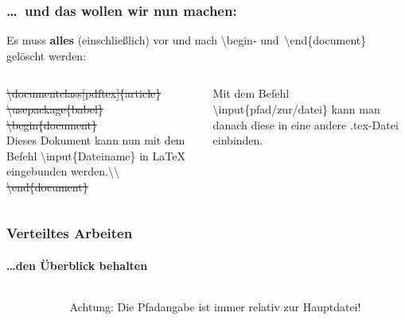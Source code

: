 
\begin{frame}
\frametitle{\ldots ~und das wollen wir nun machen:}
Es muss \textbf{alles} (einschlie\ss lich) vor und nach \color{unibablueI}\textbackslash begin\color{black}- 
und\color{unibablueI}~\textbackslash end\color{black}\{document\} gel\"oscht werden:\\[5mm]
\begin{columns}
\begin{column}{.47\textwidth}
\sout{\color{nounibaredI}\color{nounibaredI}\textbackslash documentclass\color{black}\color{nounibagreenI}[pdftex]\color{black}\{article\} \\
\color{nounibaredI}\textbackslash usepackage\color{black}\{babel\}\\
\color{nounibaredI}\color{unibablueI}\textbackslash\color{unibablueI}begin\color{black}\color{black}\{document\} }\\
Dieses Dokument kann nun mit dem Befehl \color{nounibaredI}\color{nounibaredI}\textbackslash input\color{nounibaredI}\color{black}\{Dateiname\} in LaTeX eingebunden werden.\color{nounibaredI}\color{nounibaredI}\textbackslash \color{nounibaredI}\textbackslash \color{black}  \\
\sout{\color{nounibaredI}\color{unibablueI}\textbackslash\color{unibablueI}end\color{black}\color{black}\{document\} }
\end{column}
\begin{column}{.47\textwidth}
Mit dem Befehl \color{nounibaredI}\textbackslash input\color{black}\{pfad/zur/datei\} kann man danach
 diese in eine andere {\ttfamily .tex}-Datei einbinden.

\end{column}
\end{columns}
\end{frame}


\begin{frame}
\frametitle{Verteiltes Arbeiten}
\framesubtitle{\ldots den \"Uberblick behalten}
\begin{columns}
\begin{column}{.6\textwidth}
\end{column}
\begin{column}{.3\textwidth}
\begin{alertblock}{Achtung:}
Die Pfadangabe ist immer relativ zur Hauptdatei!
\end{alertblock}
\end{column}
\end{columns}

\end{frame}


